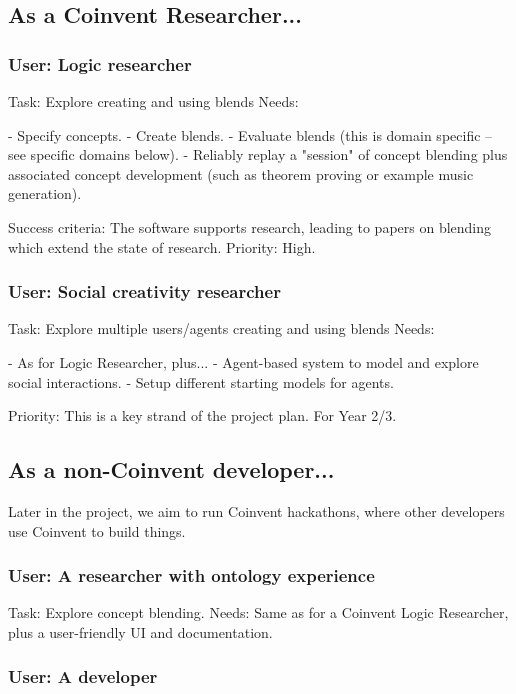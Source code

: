 \documentclass[10pt]{article}
\begin{document}
\begin{appendices}
\subsection{As a Coinvent Researcher...}

\subsubsection{User: Logic researcher}    
Task: Explore creating and using blends   
Needs:

 - Specify concepts.
 - Create blends.
 - Evaluate blends (this is domain specific -- see specific domains below).
 - Reliably replay a "session" of concept blending plus associated concept development (such as theorem proving or example music generation).

Success criteria: The software supports research, leading to papers on blending which extend the state of research.   
Priority: High.


\subsubsection{User: Social creativity researcher}    
Task: Explore multiple users/agents creating and using blends      
Needs:

 - As for Logic Researcher, plus...
 - Agent-based system to model and explore social interactions.
 - Setup different starting models for agents.

Priority: This is a key strand of the project plan. For Year 2/3.

\subsection{As a non-Coinvent developer...}

Later in the project, we aim to run Coinvent hackathons, where other developers
use Coinvent to build things.

\subsubsection{User: A researcher with ontology experience}
Task: Explore concept blending.   
Needs: Same as for a Coinvent Logic Researcher, plus a user-friendly UI and documentation.

\subsubsection{User: A developer}  


\end{appendices}
\end{document}
